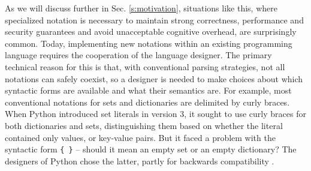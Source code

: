 %
As we will discuss further in Sec. \ref{s:motivation}, situations like this, where specialized notation is  necessary to maintain strong correctness, performance and security guarantees and avoid unacceptable cognitive overhead, are surprisingly common. 
Today, implementing new notations within an existing programming language requires the cooperation of the language designer. The primary technical reason for this is that, with conventional parsing strategies, not all notations can safely coexist, so a designer is needed to make choices about which syntactic forms are available and what their semantics are. For example, most conventional notations for sets and dictionaries are delimited by curly braces. When Python introduced set literals in version 3, it sought to use curly braces for both dictionaries and sets, distinguishing them based on whether the literal contained only values, or key-value pairs. But it faced a problem with the syntactic form \verb|{ }| -- should it mean an empty set or an empty dictionary? The designers of Python chose the latter, partly for backwards compatibility \cite{python-set-literals}. 

